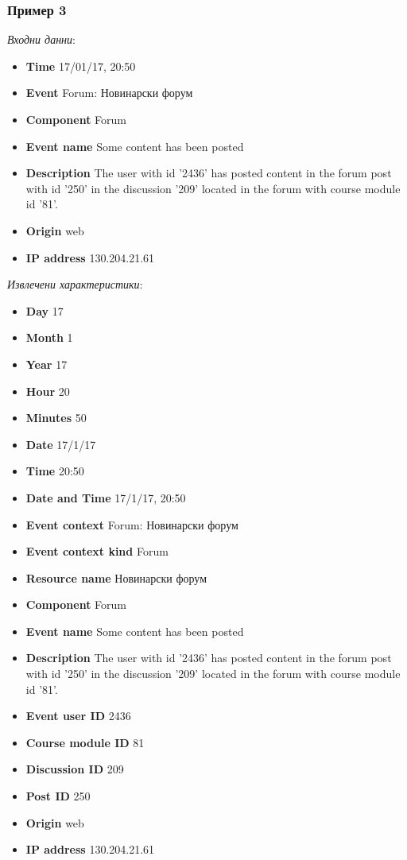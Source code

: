 \documentclass[a4paper, 12pt]{article}
\begin{document}
\subsubsection{Пример 3}		
\textit{Входни данни}:			
\begin{itemize}
\item \textbf{Time} 17/01/17, 20:50
\item \textbf{Event} Forum: Новинарски форум
\item \textbf{Component} Forum
\item \textbf{Event name} Some content has been posted
\item \textbf{Description} The user with id '2436' has posted content in the forum post with id '250' in the discussion '209' located in the forum with course module id '81'.
\item \textbf{Origin} web
\item \textbf{IP address} 130.204.21.61
\end{itemize}

\textit{Извлечени характеристики}:
\begin{itemize}
\item \textbf{Day} 17
\item \textbf{Month} 1
\item \textbf{Year} 17
\item \textbf{Hour} 20
\item \textbf{Minutes} 50
\item \textbf{Date} 17/1/17
\item \textbf{Time} 20:50
\item \textbf{Date and Time} 17/1/17, 20:50
\item \textbf{Event context} Forum: Новинарски форум
\item \textbf{Event context kind} Forum
\item \textbf{Resource name} Новинарски форум
\item \textbf{Component} Forum
\item \textbf{Event name} Some content has been posted
\item \textbf{Description} The user with id '2436' has posted content in the forum post with id '250' in the discussion '209' located in the forum with course module id '81'.
\item \textbf{Event user ID} 2436
\item \textbf{Course module ID} 81
\item \textbf{Discussion ID} 209
\item \textbf{Post ID} 250
\item \textbf{Origin} web 
\item \textbf{IP address} 130.204.21.61
\end{itemize}
\end{document}
